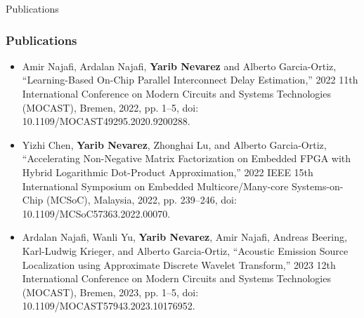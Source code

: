 \begin{frame}{Publications}
	\frametitle{Publications}
	\begin{itemize}
		\item Amir Najafi, Ardalan Najafi, \textbf{Yarib Nevarez} and Alberto Garcia-Ortiz, ``Learning-Based On-Chip Parallel Interconnect Delay Estimation,'' 2022 11th International Conference on Modern Circuits and Systems Technologies (MOCAST), Bremen, 2022, pp. 1--5, doi: 10.1109/MOCAST49295.2020.9200288.
		
		\item Yizhi Chen, \textbf{Yarib Nevarez}, Zhonghai Lu, and Alberto Garcia-Ortiz, ``Accelerating Non-Negative Matrix Factorization on Embedded FPGA with Hybrid Logarithmic Dot-Product Approximation,'' 2022 IEEE 15th International Symposium on Embedded Multicore/Many-core Systems-on-Chip (MCSoC), Malaysia, 2022, pp. 239--246, doi: 10.1109/MCSoC57363.2022.00070.
		
		\item Ardalan Najafi, Wanli Yu, \textbf{Yarib Nevarez}, Amir Najafi, Andreas Beering, Karl-Ludwig Krieger, and Alberto Garcia-Ortiz, ``Acoustic Emission Source Localization using Approximate Discrete Wavelet Transform,'' 2023 12th International Conference on Modern Circuits and Systems Technologies (MOCAST), Bremen, 2023, pp. 1--5, doi: 10.1109/MOCAST57943.2023.10176952.
	\end{itemize}
\end{frame}